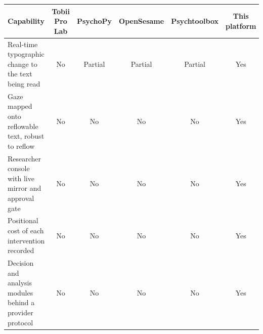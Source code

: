 \begin{widetable}
\centering
\footnotesize
\setlength{\tabcolsep}{4pt}
\caption{What a gaze-driven reading experiment needs beyond established experiment software.
Entries reflect the authors' assessment of documented capabilities; Partial means achievable with study-specific code \cite{tobii2025prolab, peirce2019psychopy, mathot2012opensesame, brainard1997psychtoolbox}.}
\label{tab:capability}
\begin{tabular}{@{}lccccc@{}}
\toprule
Capability & Tobii Pro Lab & PsychoPy & OpenSesame & Psychtoolbox & This platform \\
\midrule
Real-time typographic change to the text being read & No & Partial & Partial & Partial & Yes \\
Gaze mapped onto reflowable text, robust to reflow & No & No & No & No & Yes \\
Researcher console with live mirror and approval gate & No & No & No & No & Yes \\
Positional cost of each intervention recorded & No & No & No & No & Yes \\
Decision and analysis modules behind a provider protocol & No & No & No & No & Yes \\
\bottomrule
\end{tabular}
\end{widetable}
